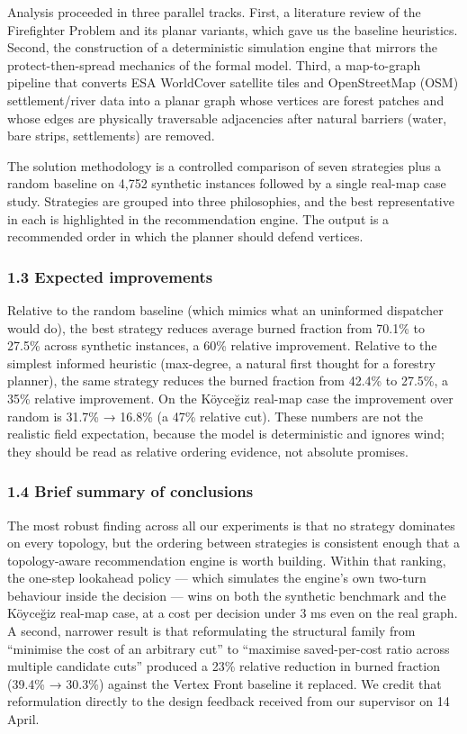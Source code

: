 \documentclass[
  11pt,
]{article}
\begin{document}
Analysis proceeded in three parallel tracks. First, a literature review
of the Firefighter Problem and its planar variants, which gave us the
baseline heuristics. Second, the construction of a deterministic
simulation engine that mirrors the protect-then-spread mechanics of the
formal model. Third, a map-to-graph pipeline that converts ESA
WorldCover satellite tiles and OpenStreetMap (OSM) settlement/river data
into a planar graph whose vertices are forest patches and whose edges
are physically traversable adjacencies after natural barriers (water,
bare strips, settlements) are removed.

The solution methodology is a controlled comparison of seven strategies
plus a random baseline on 4,752 synthetic instances followed by a single
real-map case study. Strategies are grouped into three philosophies, and
the best representative in each is highlighted in the recommendation
engine. The output is a recommended order in which the planner should
defend vertices.

\subsubsection{1.3 Expected improvements}\label{expected-improvements}

Relative to the random baseline (which mimics what an uninformed
dispatcher would do), the best strategy reduces average burned fraction
from 70.1\% to 27.5\% across synthetic instances, a 60\% relative
improvement. Relative to the simplest informed heuristic (max-degree, a
natural first thought for a forestry planner), the same strategy reduces
the burned fraction from 42.4\% to 27.5\%, a 35\% relative improvement.
On the Köyceğiz real-map case the improvement over random is 31.7\% →
16.8\% (a 47\% relative cut). These numbers are not the realistic field
expectation, because the model is deterministic and ignores wind; they
should be read as relative ordering evidence, not absolute promises.

\subsubsection{1.4 Brief summary of
conclusions}\label{brief-summary-of-conclusions}

The most robust finding across all our experiments is that no strategy
dominates on every topology, but the ordering between strategies is
consistent enough that a topology-aware recommendation engine is worth
building. Within that ranking, the one-step lookahead policy --- which
simulates the engine's own two-turn behaviour inside the decision ---
wins on both the synthetic benchmark and the Köyceğiz real-map case, at
a cost per decision under 3 ms even on the real graph. A second,
narrower result is that reformulating the structural family from
``minimise the cost of an arbitrary cut'' to ``maximise saved-per-cost
ratio across multiple candidate cuts'' produced a 23\% relative
reduction in burned fraction (39.4\% → 30.3\%) against the Vertex Front
baseline it replaced. We credit that reformulation directly to the
design feedback received from our supervisor on 14 April.
\end{document}
